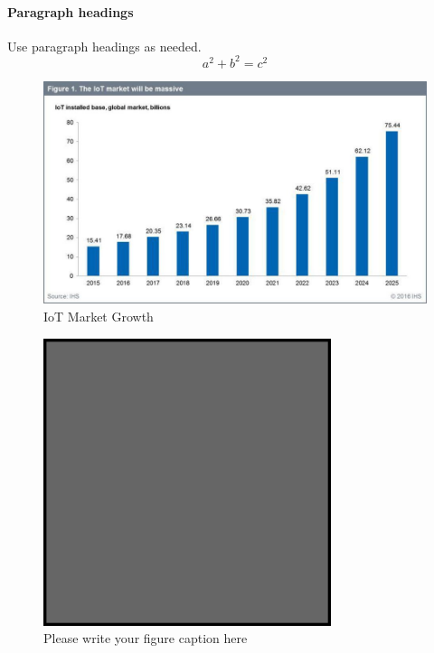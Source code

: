 \paragraph{Paragraph headings} Use paragraph headings as needed.
\begin{equation}
a^2+b^2=c^2
\end{equation}

\begin{figure}
  \includegraphics[scale=.4]{iot_growth.jpg}
    \caption{IoT Market Growth}
\label{fig:1}       %
\end{figure}
%
\begin{figure}
  \includegraphics[width=0.75\textwidth]{example.eps}
\caption{Please write your figure caption here}
\label{fig:2}       %
\end{figure}
